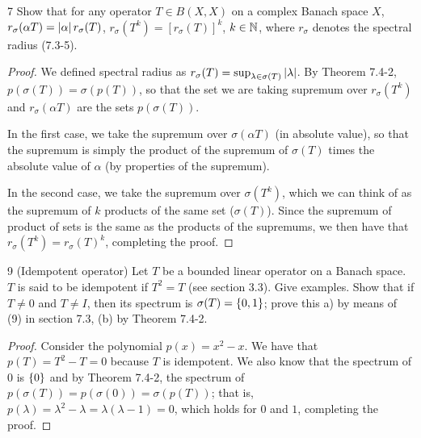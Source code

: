 \begin{exercise}{7}
Show that for any operator $T \in B(X, X)$ on a complex Banach space $X$, $r_\sigma(\alpha T) = \left\lvert \alpha\right\rvert r_\sigma(T)$, $r_\sigma(T^k) = [r_\sigma(T)]^k$, $k \in \mathbb{N}$, where $r_\sigma$ denotes the spectral radius (7.3-5).
\end{exercise}
\begin{proof}
We defined spectral radius as $r_\sigma(T) = \sup_{\lambda \in \sigma(T)} \left\lvert \lambda\right\rvert$.
By Theorem 7.4-2, $p(\sigma(T)) = \sigma(p(T))$, so that the set we are taking supremum over $r_\sigma(T^k)$ and $r_\sigma(\alpha T)$ are the sets $p(\sigma(T))$.

In the first case, we take the supremum over $\sigma(\alpha T)$ (in absolute value), so that the supremum is simply the product of the supremum of $\sigma(T)$ times the absolute value of $\alpha$ (by properties of the supremum).

In the second case, we take the supremum over $\sigma(T^k)$, which we can think of as the supremum of $k$ products of the same set ($\sigma(T)$).
Since the supremum of product of sets is the same as the products of the supremums, we then have that $r_\sigma(T^k) = r_\sigma(T)^k$, completing the proof.
\end{proof} 

\begin{exercise}{9 (Idempotent operator)}
Let $T$ be a bounded linear operator on a Banach space. 
$T$ is said to be idempotent if $T^2 = T$ (see section 3.3).
Give examples.
Show that if $T \neq 0$ and $T \neq I$, then its spectrum is $\sigma(T) = \{0, 1\}$;
prove this a) by means of (9) in section 7.3, (b) by Theorem 7.4-2.
\end{exercise}
\begin{proof}
Consider the polynomial $p(x) = x^2 - x$. 
We have that $p(T) = T^2 - T = 0$ because $T$ is idempotent.
We also know that the spectrum of $0$ is $\{0\}$ and by Theorem 7.4-2, the spectrum of $p(\sigma(T)) = p(\sigma(0)) = \sigma(p(T))$;
that is, $p(\lambda) = \lambda^2 - \lambda = \lambda (\lambda - 1) = 0$, which holds for $0$ and $1$, completing the proof.
\end{proof} 
